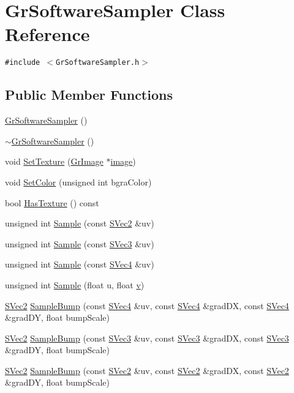 \hypertarget{class_gr_software_sampler}{
\section{GrSoftwareSampler Class Reference}
\label{class_gr_software_sampler}
}
{\tt \#include $<$GrSoftwareSampler.h$>$}

\subsection*{Public Member Functions}
\begin{CompactItemize}
\item 
\hyperlink{class_gr_software_sampler_33e593352c54e408f06a1c6b3120927a}{GrSoftwareSampler} ()
\item 
\hyperlink{class_gr_software_sampler_35e7eaef6a419acd7cf671b47fa752c3}{$\sim$GrSoftwareSampler} ()
\item 
void \hyperlink{class_gr_software_sampler_a30cc8a865e185fc0c09c9eaa0f6071d}{SetTexture} (\hyperlink{class_gr_image}{GrImage} $\ast$\hyperlink{glext__bak_8h_8943555672bc4b8056204eb92329cafa}{image})
\item 
void \hyperlink{class_gr_software_sampler_445c6e3b1fdec258a9bc6f5ff2bc5750}{SetColor} (unsigned int bgraColor)
\item 
bool \hyperlink{class_gr_software_sampler_e8e20b7c9be530eac1326a568f4549a8}{HasTexture} () const 
\item 
unsigned int \hyperlink{class_gr_software_sampler_ed7049f3a7788c85da845b744ff85e0d}{Sample} (const \hyperlink{struct_s_vec2}{SVec2} \&uv)
\item 
unsigned int \hyperlink{class_gr_software_sampler_181ecd64d3462e41efd6b30d8ea48477}{Sample} (const \hyperlink{struct_s_vec3}{SVec3} \&uv)
\item 
unsigned int \hyperlink{class_gr_software_sampler_3ac75deb852297d65b6b8a25130f6e33}{Sample} (const \hyperlink{struct_s_vec4}{SVec4} \&uv)
\item 
unsigned int \hyperlink{class_gr_software_sampler_d84404a8d6e203fa41d00fa24cdd61a6}{Sample} (float u, float \hyperlink{glext__bak_8h_5cf89b94f7478c0ebc4429b60e7ef93b}{v})
\item 
\hyperlink{struct_s_vec2}{SVec2} \hyperlink{class_gr_software_sampler_8a834ba57bb395a6cf3d9de68fba7bd0}{SampleBump} (const \hyperlink{struct_s_vec4}{SVec4} \&uv, const \hyperlink{struct_s_vec4}{SVec4} \&gradDX, const \hyperlink{struct_s_vec4}{SVec4} \&gradDY, float bumpScale)
\item 
\hyperlink{struct_s_vec2}{SVec2} \hyperlink{class_gr_software_sampler_ccd93c10412604a42a69071e71b3aa9a}{SampleBump} (const \hyperlink{struct_s_vec3}{SVec3} \&uv, const \hyperlink{struct_s_vec3}{SVec3} \&gradDX, const \hyperlink{struct_s_vec3}{SVec3} \&gradDY, float bumpScale)
\item 
\hyperlink{struct_s_vec2}{SVec2} \hyperlink{class_gr_software_sampler_12d44d76b68457f8edf5d1f083c56b95}{SampleBump} (const \hyperlink{struct_s_vec2}{SVec2} \&uv, const \hyperlink{struct_s_vec2}{SVec2} \&gradDX, const \hyperlink{struct_s_vec2}{SVec2} \&gradDY, float bumpScale)
\end{CompactItemize}


